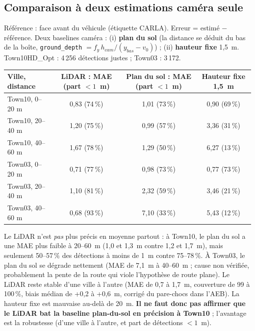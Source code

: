 \documentclass[11pt,a4paper]{article}
\newcommand{\code}[1]{\texttt{#1}}
\begin{document}
\subsection{Comparaison \`a deux estimations cam\'era seule}
R\'ef\'erence : face avant du v\'ehicule (\'etiquette CARLA). Erreur = estim\'e $-$ r\'ef\'erence. Deux baselines cam\'era : (i) \textbf{plan du sol}
(la distance se d\'eduit du bas de la bo\^ite, \code{ground\_depth} $=f_y\,h_{cam}/(y_{bas}-v_0)$) ; (ii) \textbf{hauteur fixe} 1,5~m.
Town10HD\_Opt : 4\,256 d\'etections justes ; Town03 : 3\,172.
\begin{center}\small\begin{tabular}{@{}lccc@{}}\toprule
Ville, distance & LiDAR : MAE (part $<1$~m) & Plan du sol : MAE (part $<1$~m) & Hauteur fixe 1,5~m \\\midrule
Town10, 0--20 m & 0,83 (74\,\%) & 1,01 (73\,\%) & 0,90 (69\,\%) \\
Town10, 20--40 m & 1,20 (75\,\%) & 0,99 (57\,\%) & 3,36 (31\,\%) \\
Town10, 40--60 m & 1,67 (78\,\%) & 1,29 (50\,\%) & 6,27 (13\,\%) \\
Town03, 0--20 m & 0,71 (77\,\%) & 0,98 (73\,\%) & 0,77 (73\,\%) \\
Town03, 20--40 m & 1,10 (81\,\%) & 2,32 (59\,\%) & 3,46 (21\,\%) \\
Town03, 40--60 m & 0,68 (93\,\%) & 7,10 (33\,\%) & 5,43 (12\,\%) \\
\bottomrule\end{tabular}\end{center}

\begin{honnete}
Le LiDAR n'est \emph{pas} plus pr\'ecis en moyenne partout : \`a Town10, le plan du sol a une MAE plus faible \`a 20--60~m (1,0 et 1,3~m contre 1,2 et 1,7~m),
mais seulement 50--57\,\% des d\'etections \`a moins de 1~m contre 75--78\,\%. \`A Town03, le plan du sol se d\'egrade nettement (MAE de 7,1~m \`a 40--60~m ;
cause non v\'erifi\'ee, probablement la pente de la route qui viole l'hypoth\`ese de route plane). Le LiDAR reste stable d'une ville \`a l'autre
(MAE de 0,7 \`a 1,7~m, couverture de 99 \`a 100\,\%, biais m\'edian de +0,2 \`a +0,6~m, corrig\'e du pare-chocs dans l'AEB). La hauteur fixe est mauvaise au-del\`a de 20~m.
\textbf{Il ne faut donc pas affirmer que le LiDAR bat la baseline plan-du-sol en pr\'ecision \`a Town10} ; l'avantage est la robustesse (d'une ville \`a l'autre,
et part de d\'etections $<1$~m).
\end{honnete}
\end{document}
